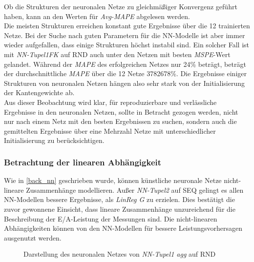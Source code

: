 \documentclass[
	12pt,
	a4paper,
	BCOR10mm,
	DIV14,
	listof=totoc,
	bibliography=totoc,
	headsepline
]{scrreprt}
\begin{document}
Ob die Strukturen der neuronalen Netze zu gleichmäßiger Konvergenz geführt haben, kann an den Werten für \textit{Avg-MAPE} abgelesen werden.\\
Die meisten Strukturen erreichen konstant gute Ergebnisse über die 12 trainierten Netze.
Bei der Suche nach guten Parametern für die NN-Modelle ist aber immer wieder aufgefallen, dass einige Strukturen höchst instabil sind.
Ein solcher Fall ist mit \textit{NN-Tupel1FK} auf RND auch unter den Netzen mit besten \textit{MSPE}-Wert gelandet.
Während der \textit{MAPE} des erfolgreichen Netzes nur 24\% beträgt, beträgt der durchschnittliche \textit{MAPE} über die 12 Netze 3782678\%.
Die Ergebnisse einiger Strukturen von neuronalen Netzen hängen also sehr stark von der Initialisierung der Kantengewichte ab.\\
Aus dieser Beobachtung wird klar, für reproduzierbare und verlässliche Ergebnisse in den neuronalen Netzen, sollte in Betracht gezogen werden, nicht nur nach einem Netz mit den besten Ergebnissen zu suchen, sondern auch die gemittelten Ergebnisse über eine Mehrzahl Netze mit unterschiedlicher Initialisierung zu berücksichtigen.

\subsubsection{Betrachtung der linearen Abhängigkeit}
Wie in \ref{back_nn} geschrieben wurde, können künstliche neuronale Netze nicht-lineare Zusammenhänge modellieren.
Außer \textit{NN-Tupel2} auf SEQ gelingt es allen NN-Modellen bessere Ergebnisse, als \textit{LinReg G} zu erzielen. Dies bestätigt die zuvor gewonnene Einsicht, dass lineare Zusammenhänge unzureichend für die Beschreibung der E/A-Leistung der Messungen sind.
Die nicht-linearen Abhängigkeiten können von den NN-Modellen für bessere Leistungsvorhersagen ausgenutzt werden.\medskip

\begin{figure}
	\centering
	\caption{Darstellung des neuronalen Netzes von \textit{NN-Tupel1 agg} auf RND}
	\label{fig:agg_net}
\end{figure} 
\end{document}
